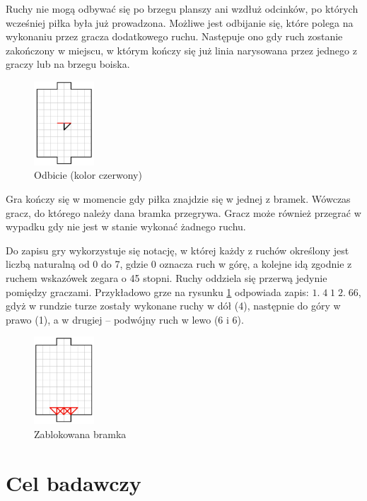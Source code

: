 \documentclass[licencjacka]{pracamgr}
\begin{document}
Ruchy nie mogą odbywać się po brzegu planszy ani wzdłuż odcinków, po których wcześniej piłka była już prowadzona.
Możliwe jest odbijanie się, które polega na wykonaniu przez gracza dodatkowego ruchu. Następuje ono gdy ruch zostanie zakończony w miejscu, w którym kończy się już linia narysowana przez jednego z graczy lub na brzegu boiska. 

\begin{figure}[ht]
  \centering
  \includegraphics[width=0.2\textwidth]{odbicie}
  \caption{Odbicie (kolor czerwony)}
  \label{fig:odbicie}
\end{figure}

Gra kończy się w momencie gdy piłka znajdzie się w jednej z bramek.
Wówczas gracz, do którego należy dana bramka przegrywa. 
Gracz może również przegrać w wypadku gdy nie jest w stanie wykonać żadnego ruchu.

Do zapisu gry wykorzystuje się notację, w której każdy z ruchów określony jest liczbą naturalną od 0 do 7, gdzie 0 oznacza ruch w górę, a kolejne idą zgodnie z ruchem wskazówek zegara o 45 stopni. Ruchy oddziela się przerwą jedynie pomiędzy graczami. Przykładowo grze na rysunku \ref{fig:odbicie} odpowiada zapis: $ 1. \; 4 \;1 \; 2. \; 66 $, gdyż w rundzie turze zostały wykonane ruchy w dół (4), następnie do góry w prawo (1), a w drugiej -- podwójny ruch w lewo (6 i 6).

\begin{figure}[ht]
  \centering
  \includegraphics[width=0.2\textwidth]{zablokowanie}
  \caption{Zablokowana bramka}
\end{figure}
 
\section{Cel badawczy} 
\end{document}
